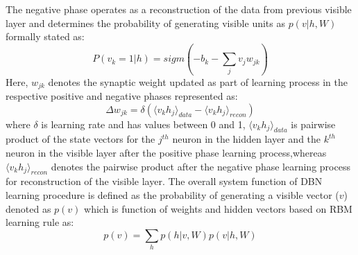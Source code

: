 The negative phase operates as a reconstruction of the data from previous visible layer and determines the probability of generating visible units as $p(v|h,W)$ formally stated as:
\begin{equation}
P(v_k = 1|h) = sigm ( -b_k - \sum_j v_j w_{jk} )    
\end{equation}
\vspace*{-1mm}
Here, $w_{jk}$ denotes the synaptic weight updated as part of learning process in the respective positive and negative phases represented as:
\begin{equation}
    \Delta w_{jk} = \delta(\langle v_k h_j \rangle_{data} - \langle v_k h_j \rangle_{recon}) 
\end{equation}
where $\delta$ is learning rate and has values between 0 and 1, $\langle v_k h_j \rangle_{data}$ is pairwise product of the state vectors for the $j^{th}$ neuron in the hidden layer and the $k^{th}$ neuron in the visible layer after the positive phase learning process,whereas $\langle v_k h_j \rangle_{recon}$
denotes the pairwise product after the negative phase learning process for reconstruction of the visible layer. The overall system function of DBN learning procedure is defined as the probability of generating a visible vector ($v$) denoted as $p(v)$ which is function of weights and hidden vectors based on RBM learning rule as:
\begin{equation}
    p(v) = \sum_h p(h|v,W) p(v|h,W)
\end{equation}

